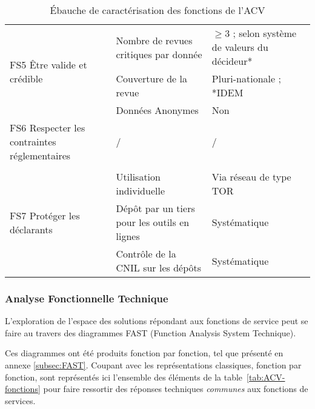 \begin{table}
\begin{tabular}{p{5cm}|p{4.5cm}|p{4.5cm}}
\multirow{3}{*}{\parbox{5cm}{FS5 Être valide et crédible}}
	& Nombre de revues critiques par donnée	& $\geq3$ ; selon système de valeurs du décideur*\\
			\cline{2-3}
	& Couverture de la revue	& Pluri-nationale ; *IDEM\\
			\cline{2-3}
	& Données Anonymes	& Non\\
	\hline
\multirow{1}{*}{\parbox{5cm}{FS6 Respecter les contraintes réglementaires}}
    & /	& /\\
	&	& \\
	\hline
\multirow{3}{*}{\parbox{5cm}{FS7 Protéger les déclarants}} %
	& Utilisation individuelle	& Via réseau de type TOR\\
				\cline{2-3}
	& Dépôt par un tiers pour les outils en lignes	& Systématique\\
				\cline{2-3}
	& Contrôle de la CNIL sur les dépôts	& Systématique\\
	\hline
\end{tabular}
\caption{Ébauche de caractérisation des fonctions de l'\gls{ACV}}
\label{tab:carac-ACV-fonctions}
\end{table}

\subsubsection{Analyse Fonctionnelle Technique}

L'exploration de l'espace des solutions répondant aux fonctions de service peut se faire au travers des diagrammes FAST (Function Analysis System Technique).

Ces diagrammes ont été produits fonction par fonction, tel que présenté en annexe \ref{subsec:FAST}.
Coupant avec les représentations classiques, fonction par fonction, sont représentés ici l'ensemble des éléments de la table~\ref{tab:ACV-fonctions} pour faire ressortir des réponses techniques \emph{communes} aux fonctions de services.

